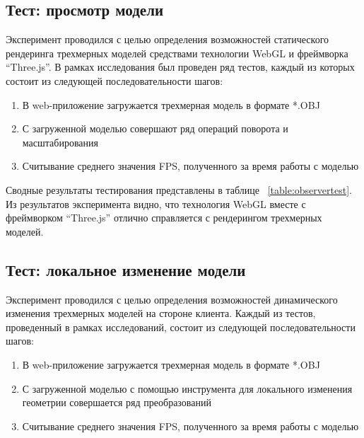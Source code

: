 \subsection{Тест: просмотр модели}

Эксперимент проводился с целью определения возможностей статического
рендеринга трехмерных моделей средствами технологии WebGL и фреймворка
``Three.js''. В рамках исследования был проведен ряд тестов, каждый из которых
состоит из следующей последовательности шагов:
\begin{enumerate}
    \item В web-приложение загружается трехмерная модель в формате *.OBJ
    \item С загруженной моделью совершают ряд операций поворота
    и масштабирования
    \item Считывание среднего значения FPS, полученного за время работы с
    моделью
\end{enumerate}

\begin{table}[ht]
\begin{center}
    \caption{Зависимость FPS от количества полигонов модели при просмотре}
\label{table:observertest}
\end{center}
\end{table}

Сводные результаты тестирования представлены в таблице
~\ref{table:observertest}.
Из результатов эксперимента видно, что технология WebGL вместе с фреймворком
``Three.js'' отлично справляется с рендерингом трехмерных моделей.

\FloatBarrier

\subsection{Тест: локальное изменение модели}

Эксперимент проводился с целью определения возможностей динамического
изменения трехмерных моделей на стороне клиента. Каждый из тестов, проведенный в
рамках исследований, состоит из следующей последовательности шагов:

\begin{enumerate}
    \item В web-приложение загружается трехмерная модель в формате *.OBJ
    \item С загруженной моделью с помощью инструмента для локального изменения
    геометрии совершается ряд преобразований
    \item Считывание среднего значения FPS, полученного за время
    работы с моделью
\end{enumerate}

